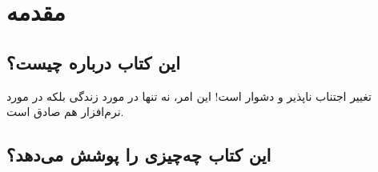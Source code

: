 \chapter*{مقدمه} \label{ch:0}

\section*{این کتاب درباره چیست؟}
تغییر اجتناب ناپذیر و دشوار است! این امر، نه تنها در مورد زندگی بلکه در مورد نرم‌افزار هم صادق است.


\section*{این کتاب چه‌چیزی را پوشش می‌دهد؟}
